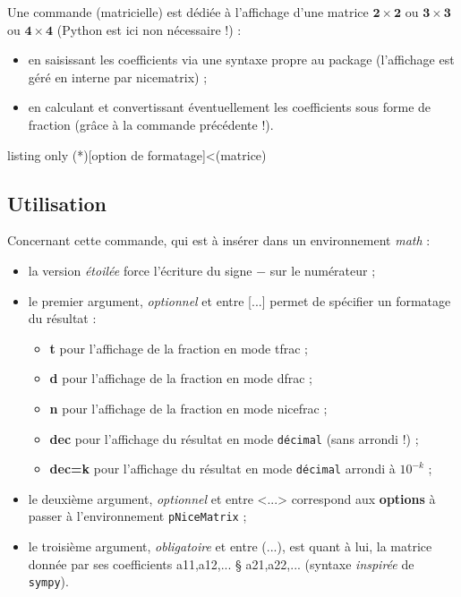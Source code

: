 \documentclass[french,a4paper,11pt]{article}
\newcommand\Cle[1]{{\bfseries\sffamily\textlangle #1\textrangle}}
\newcommand\cmaj[1]{\tcbox[vignetteMaJ]{#1}\xspace}
\begin{document}
\begin{cautionblock}
Une commande (matricielle) est dédiée à l'affichage d'une matrice $\mathbf{2\times2}$ ou $\mathbf{3\times3}$ ou $\mathbf{4\times4}$ (\textsf{Python} est ici non nécessaire !) :

\begin{itemize}
	\item en saisissant les coefficients via une syntaxe propre au package (l'affichage est géré en interne par \textsf{nicematrix}) ;
	\item en calculant et convertissant éventuellement les coefficients sous forme de fraction (grâce à la commande précédente !).
\end{itemize}
\vspace*{-\baselineskip}\leavevmode
\end{cautionblock}

\begin{PresentationCode}{listing only}
\AffMatrice(*)[option de formatage]<(matrice)
\end{PresentationCode}

\subsection{Utilisation}

\begin{tipblock}
Concernant cette commande, qui est à insérer dans un environnement \textit{math} :

\begin{itemize}
	\item \cmaj{0.1.3} la version \textit{étoilée} force l'écriture du signe \og $-$ \fg{} sur le numérateur ;
	\item le premier argument, \textit{optionnel} et entre \textsf{[...]} permet de spécifier un formatage du résultat :
	\begin{itemize}
		\item \Cle{t} pour l'affichage de la fraction en mode \textsf{tfrac} ;
		\item \Cle{d} pour l'affichage de la fraction en mode \textsf{dfrac} ;
		\item \Cle{n} pour l'affichage de la fraction en mode \textsf{nicefrac} ;
		\item \Cle{dec} pour l'affichage du résultat en mode \texttt{décimal} (sans arrondi !) ;
		\item \Cle{dec=k} pour l'affichage du résultat en mode \texttt{décimal} arrondi à $10^{-k}$ ;
	\end{itemize}
	\item le deuxième argument, \textit{optionnel} et entre \textsf{<...>} correspond aux \Cle{options} à passer à l'environnement \texttt{pNiceMatrix} ;
	\item le troisième argument, \textit{obligatoire} et entre \textsf{(...)}, est quant à lui, la matrice donnée par ses coefficients \textsf{a11,a12,... § a21,a22,...} (syntaxe \textit{inspirée} de \texttt{sympy}).
\end{itemize}
\vspace*{-\baselineskip}\leavevmode
\end{tipblock}
\end{document}
